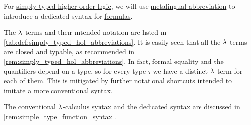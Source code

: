 \begin{definition}\label{def:simply_typed_hol_abbreviations}
  For \hyperref[def:simply_typed_hol]{simply typed higher-order logic}, we will use \hyperref[con:metalingual_abbreviation]{metalingual abbreviation} to introduce a dedicated syntax for \hyperref[def:simply_typed_hol_formula]{formulas}.

  The \( {\mathrm \lambda} \)-terms and their intended notation are listed in \cref{tab:def:simply_typed_hol_abbreviations}. It is easily seen that all the \( {\mathrm \lambda} \)-terms are \hyperref[def:lambda_combinator]{closed} and \hyperref[def:typability]{typable}, as recommended in \cref{rem:simply_typed_hol_abbreviations}. In fact, formal equality and the quantifiers depend on a type, so for every type \( \tau \) we have a distinct \( {\mathrm \lambda} \)-term for each of them. This is mitigated by further notational shortcuts intended to imitate a more conventional syntax.

  The conventional \( {\mathrm \lambda} \)-calculus syntax and the dedicated syntax are discussed in \cref{rem:simple_type_function_syntax}.


\end{definition}
